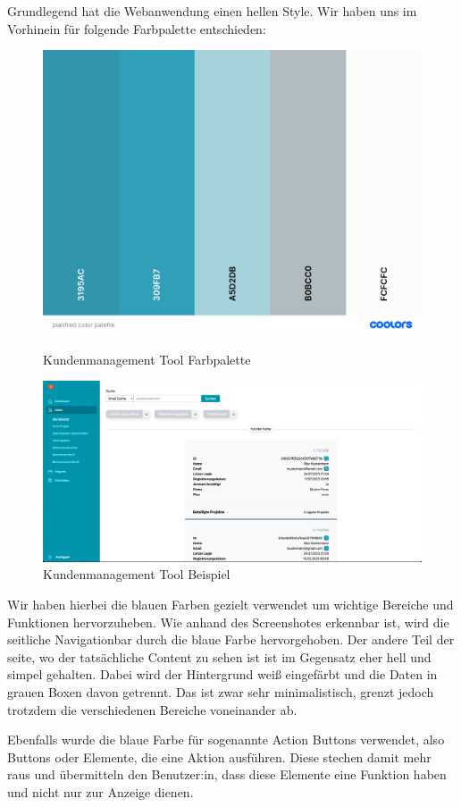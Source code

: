 Grundlegend hat die Webanwendung einen hellen Style. Wir haben uns im Vorhinein für folgende Farbpalette entschieden:

\begin{figure}[h!]
    \centering
    \includegraphics[width=1\textwidth]{pics/planfred-color-palette.png}
    \caption{Kundenmanagement Tool Farbpalette}
    \cite{frontend_design_colors}
    \label{fig:mesh1}
\end{figure}

\begin{figure}[h!]
    \centering
    \includegraphics[width=1\textwidth]{pics/planfred-ui-ux-example.png}
    \caption{Kundenmanagement Tool Beispiel}
    \label{fig:mesh1}
\end{figure}

Wir haben hierbei die blauen Farben gezielt verwendet um wichtige Bereiche und Funktionen hervorzuheben. Wie anhand des Screenshotes erkennbar ist, wird die seitliche Navigationbar durch die blaue Farbe hervorgehoben. Der andere Teil der seite, wo der tatsächliche Content zu sehen ist ist im Gegensatz eher hell und simpel gehalten. Dabei wird der Hintergrund weiß eingefärbt und die Daten in grauen Boxen davon getrennt. Das ist zwar sehr minimalistisch, grenzt jedoch trotzdem die verschiedenen Bereiche voneinander ab.

Ebenfalls wurde die blaue Farbe für sogenannte Action Buttons verwendet, also Buttons oder Elemente, die eine Aktion ausführen. Diese stechen damit mehr raus und übermitteln den Benutzer:in, dass diese Elemente eine Funktion haben und nicht nur zur Anzeige dienen.

